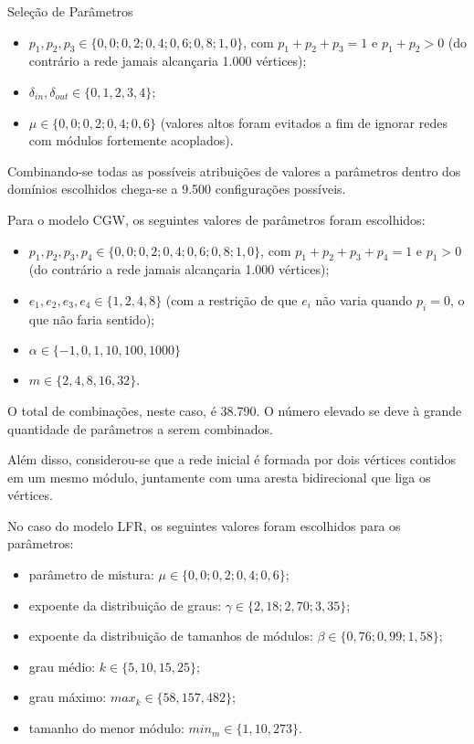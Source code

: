 \begin{section}{Seleção de Parâmetros}
\begin{itemize}
	\item $p_1, p_2, p_3 \in \{0,0; 0,2; 0,4; 0,6; 0,8; 1,0\}$, com $p_1 + p_2 + p_3 = 1$ e $p_1 + p_2 > 0$ (do contrário a rede jamais alcançaria 1.000 vértices);
	\item $\delta_{in}, \delta_{out} \in \{0, 1, 2, 3, 4\}$;
	\item $\mu \in \{0,0; 0,2; 0,4; 0,6\}$ (valores altos foram evitados a fim de ignorar redes com módulos fortemente acoplados).
\end{itemize}

Combinando-se todas as possíveis atribuições de valores a parâmetros dentro dos domínios escolhidos chega-se a 9.500 configurações possíveis.

Para o modelo CGW, os seguintes valores de parâmetros foram escolhidos:

\begin{itemize}
	\item $p_1, p_2, p_3, p_4 \in \{0,0; 0,2; 0,4; 0,6; 0,8; 1,0\}$, com $p_1 + p_2 + p_3 + p_4 = 1$ e $p_1 > 0$ (do contrário a rede jamais alcançaria 1.000 vértices);
	\item $e_1, e_2, e_3, e_4 \in \{1, 2, 4, 8\}$ (com a restrição de que $e_i$ não varia quando $p_i = 0$, o que não faria sentido);
	\item $\alpha \in \{-1, 0, 1, 10, 100, 1000\}$
	\item $m \in \{2, 4, 8, 16, 32\}$.
\end{itemize}

O total de combinações, neste caso, é 38.790. O número elevado se deve à grande quantidade de parâmetros a serem combinados.

Além disso, considerou-se que a rede inicial é formada por dois vértices contidos em um mesmo módulo, juntamente com uma aresta bidirecional que liga os vértices.

No caso do modelo LFR, os seguintes valores foram escolhidos para os parâmetros:

\begin{itemize}
	\item parâmetro de mistura: $\mu \in \{0,0; 0,2; 0,4; 0,6\}$;
	\item expoente da distribuição de graus: $\gamma \in \{2,18; 2,70; 3,35\}$;
	\item expoente da distribuição de tamanhos de módulos: $\beta \in \{0,76; 0,99; 1,58\}$;
	\item grau médio: $k \in \{5, 10, 15, 25\}$;
	\item grau máximo: $max_k \in \{58, 157, 482\}$;
	\item tamanho do menor módulo: $min_m \in \{1, 10, 273\}$.
\end{itemize}


\end{section}
